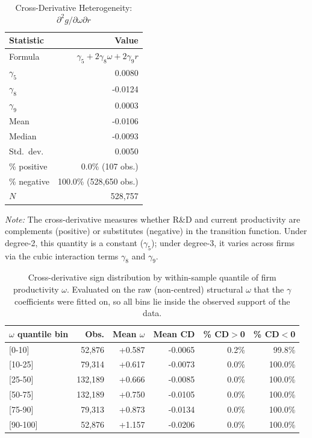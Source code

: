 \documentclass[a4paper, 12pt]{article}
\begin{document}
\begin{table}[htbp]
\centering
\caption{Cross-Derivative Heterogeneity: $\partial^2 g / \partial\omega\partial r$}
\label{tab:dj_cross_deriv}
\begin{tabular}{lr}
\toprule
Statistic & Value \\
\midrule
Formula & $\gamma_5 + 2\gamma_8\omega + 2\gamma_9 r$ \\
$\gamma_5$ & 0.0080 \\
$\gamma_8$ & -0.0124 \\
$\gamma_9$ & 0.0003 \\
\midrule
Mean & -0.0106 \\
Median & -0.0093 \\
Std.\ dev. & 0.0050 \\
\midrule
\% positive & 0.0\% (107 obs.) \\
\% negative & 100.0\% (528,650 obs.) \\
$N$ & 528,757 \\
\bottomrule
\end{tabular}
\begin{flushleft}
\footnotesize
\textit{Note:} The cross-derivative measures whether R\&D and current productivity
are complements (positive) or substitutes (negative) in the transition function.
Under degree-2, this quantity is a constant ($\gamma_5$); under degree-3,
it varies across firms via the cubic interaction terms $\gamma_8$ and $\gamma_9$.
\end{flushleft}
\end{table}

\begin{table}[htbp]
\centering
\caption{Cross-derivative sign distribution by within-sample quantile of firm productivity $\omega$.  Evaluated on the raw (non-centred) structural $\omega$ that the $\gamma$ coefficients were fitted on, so all bins lie inside the observed support of the data.}
\label{tab:dj_cd_by_quantile}
\begin{tabular}{lrrrrr}
\toprule
$\omega$ quantile bin & Obs. & Mean $\omega$ & Mean CD & \% CD$>$0 & \% CD$<$0 \\
\midrule
  {[0-10]} & 52,876 & +0.587 & -0.0065 & 0.2\% & 99.8\% \\
  {[10-25]} & 79,314 & +0.617 & -0.0073 & 0.0\% & 100.0\% \\
  {[25-50]} & 132,189 & +0.666 & -0.0085 & 0.0\% & 100.0\% \\
  {[50-75]} & 132,189 & +0.750 & -0.0105 & 0.0\% & 100.0\% \\
  {[75-90]} & 79,313 & +0.873 & -0.0134 & 0.0\% & 100.0\% \\
  {[90-100]} & 52,876 & +1.157 & -0.0206 & 0.0\% & 100.0\% \\
\bottomrule
\end{tabular}
\end{table}
\end{document}
